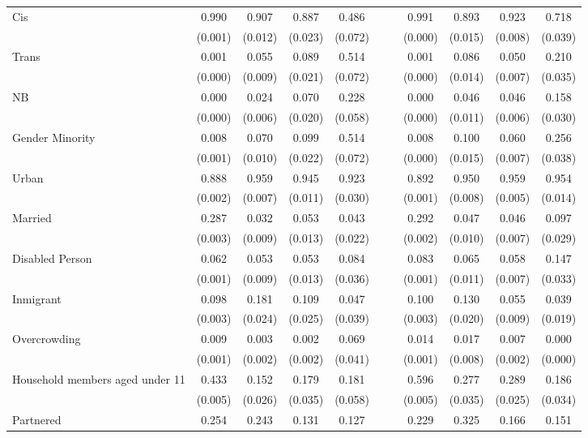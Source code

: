 \begin{table}[htbp]
{\begin{tabular}{lccccc|ccccc}
Cis & 0.990 & 0.907 & 0.887 & 0.486 &  &  & 0.991 & 0.893 & 0.923 & 0.718 \\
 & (0.001) & (0.012) & (0.023) & (0.072) &  &  & (0.000) & (0.015) & (0.008) & (0.039) \\
Trans & 0.001 & 0.055 & 0.089 & 0.514 &  &  & 0.001 & 0.086 & 0.050 & 0.210 \\
 & (0.000) & (0.009) & (0.021) & (0.072) &  &  & (0.000) & (0.014) & (0.007) & (0.035) \\
NB & 0.000 & 0.024 & 0.070 & 0.228 &  &  & 0.000 & 0.046 & 0.046 & 0.158 \\
 & (0.000) & (0.006) & (0.020) & (0.058) &  &  & (0.000) & (0.011) & (0.006) & (0.030) \\
Gender Minority & 0.008 & 0.070 & 0.099 & 0.514 &  &  & 0.008 & 0.100 & 0.060 & 0.256 \\
 & (0.001) & (0.010) & (0.022) & (0.072) &  &  & (0.000) & (0.015) & (0.007) & (0.038) \\
Urban & 0.888 & 0.959 & 0.945 & 0.923 &  &  & 0.892 & 0.950 & 0.959 & 0.954 \\
 & (0.002) & (0.007) & (0.011) & (0.030) &  &  & (0.001) & (0.008) & (0.005) & (0.014) \\
Married & 0.287 & 0.032 & 0.053 & 0.043 &  &  & 0.292 & 0.047 & 0.046 & 0.097 \\
 & (0.003) & (0.009) & (0.013) & (0.022) &  &  & (0.002) & (0.010) & (0.007) & (0.029) \\
Disabled Person & 0.062 & 0.053 & 0.053 & 0.084 &  &  & 0.083 & 0.065 & 0.058 & 0.147 \\
 & (0.001) & (0.009) & (0.013) & (0.036) &  &  & (0.001) & (0.011) & (0.007) & (0.033) \\
Inmigrant & 0.098 & 0.181 & 0.109 & 0.047 &  &  & 0.100 & 0.130 & 0.055 & 0.039 \\
 & (0.003) & (0.024) & (0.025) & (0.039) &  &  & (0.003) & (0.020) & (0.009) & (0.019) \\
Overcrowding & 0.009 & 0.003 & 0.002 & 0.069 &  &  & 0.014 & 0.017 & 0.007 & 0.000 \\
 & (0.001) & (0.002) & (0.002) & (0.041) &  &  & (0.001) & (0.008) & (0.002) & (0.000) \\
Household members aged under 11 & 0.433 & 0.152 & 0.179 & 0.181 &  &  & 0.596 & 0.277 & 0.289 & 0.186 \\
 & (0.005) & (0.026) & (0.035) & (0.058) &  &  & (0.005) & (0.035) & (0.025) & (0.034) \\
Partnered & 0.254 & 0.243 & 0.131 & 0.127 &  &  & 0.229 & 0.325 & 0.166 & 0.151 \\

\end{tabular}}
\end{table}
